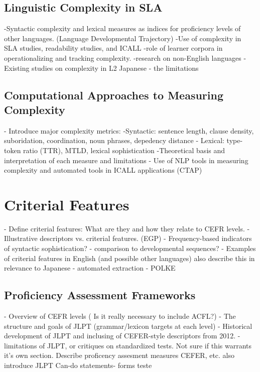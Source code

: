 
\subsection{Linguistic Complexity in SLA}
-Syntactic complexity and lexical measures as indices for proficiency levels of other languages. (Language Developmental Trajectory)
-Use of complexity in SLA studies, readability studies, and ICALL
-role of learner corpora in operationalizing and tracking complexity.
-research on non-English languages
-Existing studies on complexity in L2 Japanese - the limitations


\subsection{Computational Approaches to Measuring Complexity}
- Introduce major complexity metrics:
    -Syntactic: sentence length, clause density, suboridation, coordination, noun phrases, depedency distance
    - Lexical: type-token ratio (TTR), MTLD, lexical sophistication
-Theoretical basis and interpretation of each measure and limitations
- Use of NLP tools in measuring complexity and automated tools in ICALL applications (CTAP)

\section{Criterial Features}
- Define criterial features: What are they and how they relate to CEFR levels.
- Illustrative descriptors vs. criterial features. (EGP)
- Frequency-based indicators of syntactic sophistication? \cite{Ellis2004}
    - comparison to developmental sequences?
- Examples of criterial features in English (and possible other languages) also describe this in relevance to Japanese
- automated extraction - POLKE


\subsection{Proficiency Assessment Frameworks}
- Overview of CEFR levels ( Is it really necessary to include ACFL?)
- The structure and goals of JLPT (grammar/lexicon targets at each level)
- Historical development of JLPT and inclusing of CEFER-style descriptors from 2012.
- limitations of JLPT, or critiques on standardized tests.
Not sure if this warrants it's own section. Describe proficency assesment measures CEFER, etc. also introduce JLPT
Can-do statements- forms teste


